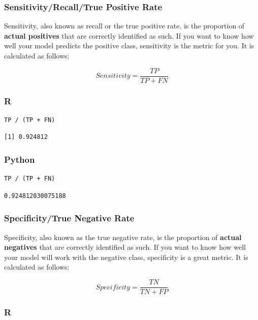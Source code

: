 \documentclass[
  letterpaper,
]{krantz}
\begin{document}
\subsubsection{Sensitivity/Recall/True Positive
Rate}\label{sec-knowing-metrics-sensitivity}

Sensitivity, also known as recall or the true positive rate, is the
proportion of \textbf{actual positives} that are correctly identified as
such. If you want to know how well your model predicts the positive
class, sensitivity is the metric for you. It is calculated as follows:

\[Sensitivity = \frac{TP}{TP + FN}\]

\subsubsection{R}

\begin{verbatim}
TP / (TP + FN)
\end{verbatim}

\begin{verbatim}
[1] 0.924812
\end{verbatim}

\subsubsection{Python}

\begin{verbatim}
TP / (TP + FN)
\end{verbatim}

\begin{verbatim}
0.924812030075188
\end{verbatim}

\subsubsection{Specificity/True Negative
Rate}\label{sec-knowing-metrics-specificity}

Specificity, also known as the true negative rate, is the proportion of
\textbf{actual negatives} that are correctly identified as such. If you
want to know how well your model will work with the negative class,
specificity is a great metric. It is calculated as follows:

\[Specificity = \frac{TN}{TN + FP}\]

\subsubsection{R}
\end{document}
